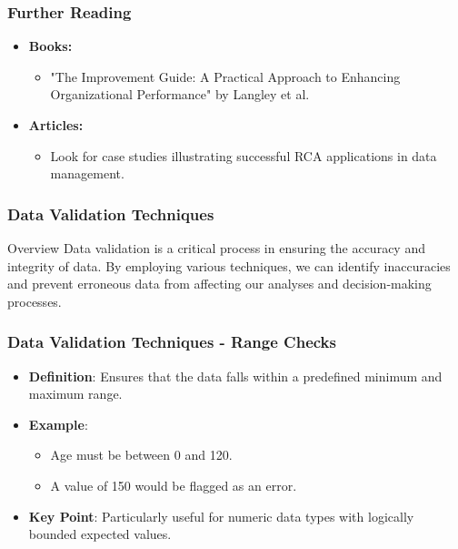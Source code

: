 \documentclass{beamer}
\begin{document}
\begin{frame}[fragile]
    \frametitle{Further Reading}
    \begin{itemize}
        \item \textbf{Books:} 
        \begin{itemize}
            \item "The Improvement Guide: A Practical Approach to Enhancing Organizational Performance" by Langley et al.
        \end{itemize}
        \item \textbf{Articles:} 
        \begin{itemize}
            \item Look for case studies illustrating successful RCA applications in data management.
        \end{itemize}
    \end{itemize}
\end{frame}

\begin{frame}[fragile]
    \frametitle{Data Validation Techniques}
    
    \begin{block}{Overview}
        Data validation is a critical process in ensuring the accuracy and integrity of data. 
        By employing various techniques, we can identify inaccuracies and prevent erroneous data 
        from affecting our analyses and decision-making processes.
    \end{block}
\end{frame}

\begin{frame}[fragile]
    \frametitle{Data Validation Techniques - Range Checks}
    
    \begin{itemize}
        \item \textbf{Definition}: Ensures that the data falls within a predefined minimum and maximum range. 
        \item \textbf{Example}: 
        \begin{itemize}
            \item Age must be between 0 and 120.
            \item A value of 150 would be flagged as an error.
        \end{itemize}
        \item \textbf{Key Point}: Particularly useful for numeric data types with logically bounded expected values.
    \end{itemize}
\end{frame}
\end{document}
